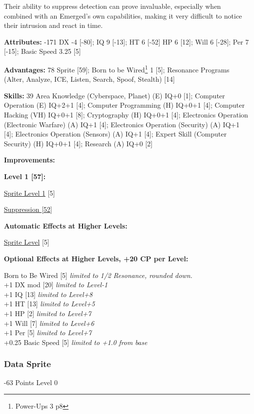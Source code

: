 \begin{multicols*}{3}
Their ability to suppress detection can prove invaluable, especially when combined with an Emerged's own capabilities, making it very difficult to notice their intrusion and react in time.

\textbf{Attributes:} -171
DX -4 [-80]; IQ 9 [-13]; HT 6 [-52]
HP 6 [12]; Will 6 [-28]; Per 7 [-15]; Basic Speed 3.25 [5]

\textbf{Advantages:} 78
Sprite [59]; Born to be Wired\footnote{Power-Ups 3 p8} 1 [5]; Resonance Programs (Alter, Analyze, ICE, Listen, Search, Spoof, Stealth) [14]

\textbf{Skills:} 39
Area Knowledge (Cyberspace, Planet) (E) IQ+0 [1]; Computer Operation (E) IQ+2+1 [4]; Computer Programming (H) IQ+0+1 [4]; Computer Hacking (VH) IQ+0+1 [8]; Cryptography (H) IQ+0+1 [4]; Electronics Operation (Electronic Warfare) (A) IQ+1 [4]; Electronics Operation (Security) (A) IQ+1 [4]; Electronics Operation (Sensors) (A) IQ+1 [4]; Expert Skill (Computer Security) (H) IQ+0+1 [4]; Research (A) IQ+0 [2]

\textbf{ Improvements:}

\textbf{Level 1 [57]:}

\hyperref[sprite_level]{Sprite Level 1} [5]

\hyperref[suppression]{Suppression [52]}

\textbf{Automatic Effects at Higher Levels:}

\hyperref[sprite_level]{Sprite Level} [5]

\textbf{Optional Effects at Higher Levels, +20 CP per Level:}

Born to Be Wired [5] \textit{limited to 1/2 Resonance, rounded down.}\\
+1 DX mod [20] \textit{limited to Level-1}\\
+1 IQ [13] \textit{limited to Level+8}\\
+1 HT [13] \textit{limited to Level+5}\\
+1 HP [2] \textit{limited to Level+7}\\
+1 Will [7] \textit{limited to Level+6}\\
+1 Per [5] \textit{limited to Level+7}\\
+0.25 Basic Speed [5] \textit{limited to +1.0 from base}\\

\subsubsection{Data Sprite}
\begin{flushright}
	-63 Points Level 0
\end{flushright}


\end{multicols*}
